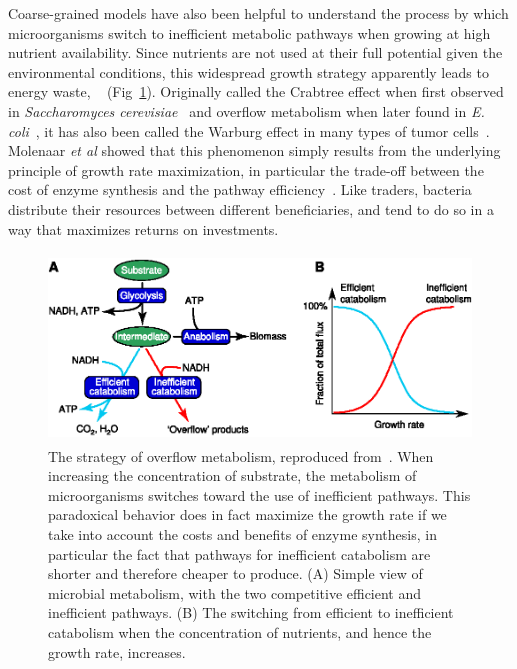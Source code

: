 Coarse-grained models have also been helpful to understand the process by which microorganisms switch to inefficient metabolic pathways when growing at high nutrient availability.
Since nutrients are not used at their full potential given the environmental conditions, this widespread growth strategy apparently leads to energy waste, ~\cite{molenaar_shifts_2009} (Fig~\ref{fig:molenaar_overflow}).
Originally called the Crabtree effect when first observed in \textit{Saccharomyces cerevisiae}~\cite{dijken_kinetics_1993} and overflow metabolism when later found in \textit{E. coli}~\cite{vemuri_overflow_2006}, it has also been called the Warburg effect in many types of tumor cells~\cite{mckeehan_glycolysis_1982,hsu_cancer_2008}.
Molenaar \textit{et al} showed that this phenomenon simply results from the underlying principle of growth rate maximization, in particular the trade-off between the cost of enzyme synthesis and the pathway efficiency~\cite{molenaar_shifts_2009}.
Like traders, bacteria distribute their resources between different beneficiaries, and tend to do so in a way that maximizes returns on investments.

\begin{figure}[!h]
\centering
\includegraphics[height=5cm]{./Fig/Chapter1/molenaar_overflow.eps}
\caption{The strategy of overflow metabolism, reproduced from~\cite{molenaar_shifts_2009}.
When increasing the concentration of substrate, the metabolism of microorganisms switches toward the use of inefficient pathways.
This paradoxical behavior does in fact maximize the growth rate if we take into account the costs and benefits of enzyme synthesis, in particular the fact that pathways for inefficient catabolism are shorter and therefore cheaper to produce.
(A) Simple view of microbial metabolism, with the two competitive efficient and inefficient pathways.
(B) The switching from efficient to inefficient catabolism when the concentration of nutrients, and hence the growth rate, increases.
}
\label{fig:molenaar_overflow}
\end{figure}

